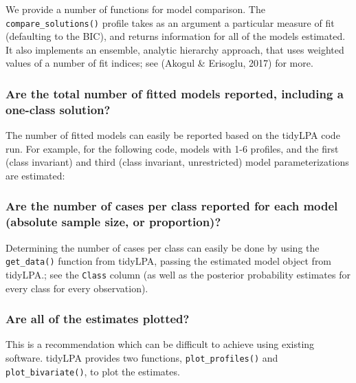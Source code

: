 \documentclass[english,man]{apa6}
\begin{document}
We provide a number of functions for model comparison. The \texttt{compare\_solutions()} profile
takes as an argument a particular measure of fit (defaulting to the BIC), and returns information
for all of the models estimated. It also implements an ensemble, analytic hierarchy approach, that uses weighted values of a number of fit indices; see (Akogul \& Erisoglu, 2017) for more.

\hypertarget{are-the-total-number-of-fitted-models-reported-including-a-one-class-solution}{%
\subsubsection{Are the total number of fitted models reported, including a one-class solution?}\label{are-the-total-number-of-fitted-models-reported-including-a-one-class-solution}}

The number of fitted models can easily be reported based on the tidyLPA code run. For example, for the following code, models with 1-6 profiles, and the first (class invariant) and third (class invariant, unrestricted) model parameterizations are estimated:

\hypertarget{are-the-number-of-cases-per-class-reported-for-each-model-absolute-sample-size-or-proportion}{%
\subsubsection{Are the number of cases per class reported for each model (absolute sample size, or proportion)?}\label{are-the-number-of-cases-per-class-reported-for-each-model-absolute-sample-size-or-proportion}}

Determining the number of cases per class can easily be done by using the \texttt{get\_data()} function from tidyLPA, passing the estimated model object from tidyLPA.; see the \texttt{Class} column (as well as the posterior probability estimates for every class for every observation).

\hypertarget{are-all-of-the-estimates-plotted}{%
\subsubsection{Are all of the estimates plotted?}\label{are-all-of-the-estimates-plotted}}

This is a recommendation which can be difficult to achieve using existing software. tidyLPA provides two functions, \texttt{plot\_profiles()} and \texttt{plot\_bivariate()}, to plot the estimates.
\end{document}
